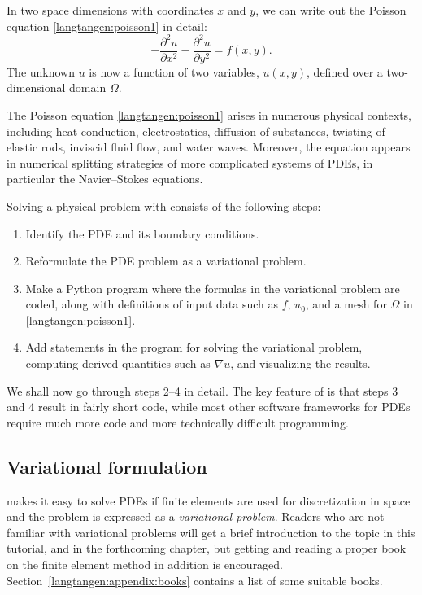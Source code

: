 In two space dimensions with coordinates $x$ and $y$, we can write out
the Poisson equation \eqref{langtangen:poisson1} in detail:
\begin{equation}
- \frac{\partial^2 u}{\partial x^2}
- \frac{\partial^2 u}{\partial y^2} = f(x,y).
\end{equation}
The unknown $u$ is now a function of two variables, $u(x,y)$, defined
over a two-dimensional domain $\Omega$.

The Poisson equation \eqref{langtangen:poisson1} arises in numerous
physical contexts, including heat conduction, electrostatics, diffusion
of substances, twisting of elastic rods, inviscid fluid flow, and water
waves. Moreover, the equation appears in numerical splitting strategies
of more complicated systems of PDEs, in particular the Navier--Stokes
equations.

Solving a physical problem with \fenics{} consists of the following steps:
\begin{enumerate}
  \item Identify the PDE and its boundary conditions.

  \item Reformulate the PDE problem as a variational problem.

  \item Make a Python program where the formulas in the variational
  problem are coded, along with definitions of input data such as $f$,
  $u_0$, and a mesh for $\Omega$ in \eqref{langtangen:poisson1}.

  \item Add statements in the program for solving the variational problem,
  computing derived quantities such as $\nabla u$, and visualizing
  the results.
\end{enumerate}
We shall now go through steps 2--4 in detail.  The key feature of
\fenics{} is that steps 3 and 4 result in fairly short code, while
most other software frameworks for PDEs require much more code and more
technically difficult programming.

\subsection{Variational formulation}
\label{langtangen:poisson1:varform}

\fenics{} makes it easy to solve PDEs if finite elements are
used for discretization in space and the problem is expressed as
a \emph{variational problem}. Readers who are not familiar with
variational problems will get a brief introduction to the topic in
this tutorial, and in the forthcoming chapter, but getting and reading
a proper book on the finite element method in addition is encouraged.
Section~\ref{langtangen:appendix:books} contains a list of some suitable
books.

